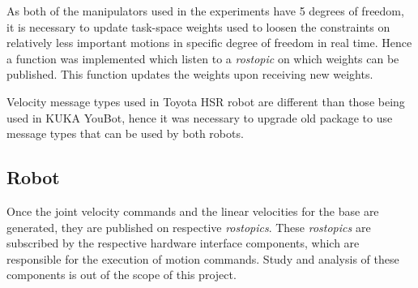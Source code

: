 As both of the manipulators used in the experiments have 5 degrees of freedom, it is necessary to update task-space weights used to loosen the constraints on relatively less important motions in specific degree of freedom in real time. Hence a function was implemented which listen to a \textit{rostopic} on which weights can be published. This function updates the weights upon receiving new weights.   

Velocity message types used in Toyota HSR robot are different than those being used in KUKA YouBot, hence it was necessary to upgrade old package to use message types that can be used by both robots.         

\subsection{Robot}

Once the joint velocity commands and the linear velocities for the base are generated, they are published on respective \textit{rostopics}. These \textit{rostopics} are subscribed by the respective hardware interface components, which are responsible for the execution of motion commands. Study and analysis of these components is out of the scope of this project.  



